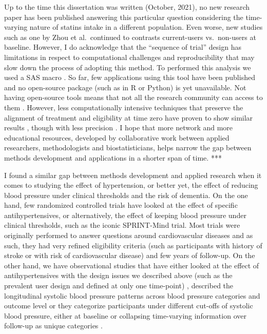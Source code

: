 \documentclass[
]{book}
\begin{document}
Up to the time this dissertation was written (October, 2021), no new research paper has been published answering this particular question considering the time-varying nature of statins intake in a different population. Even worse, new studies such as one by Zhou et al.~continued to contrasts current-users vs.~non-users at baseline\autocite{zhou2021}. However, I do acknowledge that the ``sequence of trial'' design has limitations in respect to computational challenges and reproducibility that may slow down the process of adopting this method. To performed this analysis we used a SAS macro \autocite{danaei2013}. So far, few applications using this tool have been published and no open-source package (such as in R or Python) is yet unavailable. Not having open-source tools means that not all the research community can access to them . However, less computationally intensive techniques that preserve the alignment of treatment and eligibility at time zero have proven to show similar results \autocite{garcia_albeniz_2017,emilsson2018}, though with less precision . I hope that more network and more educational resources, developed by collaborative work between applied researchers, methodologists and biostatisticians, helps narrow the gap between methods development and applications in a shorter span of time.
***

I found a similar gap between methods development and applied research when it comes to studying the effect of hypertension, or better yet, the effect of reducing blood pressure under clinical thresholds and the risk of dementia. On the one hand, few randomized controlled trials have looked at the effect of specific antihypertensives, or alternatively, the effect of keeping blood pressure under clinical thresholds, such as the iconic SPRINT-Mind trial\autocite{williamson2019}. Most trials were originally performed to answer questions around cardiovascular diseases and as such, they had very refined eligibility criteria (such as participants with history of stroke or with risk of cardiovascular disease) and few years of follow-up\autocite{forette1998,tzourio2003,lithell2003,diener2008,anderson2011,williamson2019}. On the other hand, we have observational studies that have either looked at the effect of antihypertensives with the design issues we described above (such as the prevalent user design and defined at only one time-point) \autocite{ding2020}, described the longitudinal systolic blood pressure patterns across blood pressure categories and outcome level \autocite{rajan2018} or they categorize participants under different cut-offs of systolic blood pressure, either at baseline or collapsing time-varying information over follow-up as unique categories \autocite{walker2019}.
\end{document}
